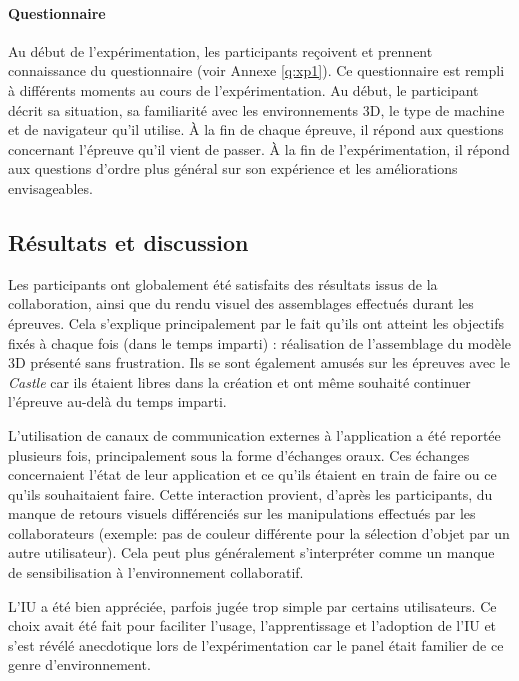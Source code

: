 \paragraph{Questionnaire}
Au début de l'expérimentation, les participants reçoivent et prennent 
con\-naissance 
du questionnaire (voir Annexe \ref{q:xp1}). Ce questionnaire est rempli à différents 
moments au cours de l'expérimentation. Au début, le participant décrit sa situation, 
sa familiarité avec les environnements \gls{3D}, le type de machine et de 
navigateur qu'il utilise. À la fin de chaque épreuve, il répond aux questions concernant 
l'épreuve qu'il vient de passer. À la fin de l'expérimentation, il répond aux 
questions d'ordre plus général sur son expérience et les améliorations 
envisageables.
\subsection{Résultats et discussion}
Les participants ont globalement été satisfaits des résultats issus de la 
collaboration, ainsi que du rendu visuel des assemblages effectués durant les 
épreuves. Cela s'explique principalement par le fait qu'ils ont atteint les 
objectifs fixés à chaque fois (dans le temps imparti) : réalisation de l'assemblage du modèle \gls{3D} 
présenté sans frustration. Ils se sont également \og amusés\fg{} sur les épreuves
avec le \textit{Castle} car ils étaient libres dans la création et ont même souhaité 
continuer l'épreuve au-delà du temps imparti. 

L'utilisation de canaux de communication 
externes à l'application a été reportée plusieurs fois, principalement sous la forme 
d'échanges oraux. Ces échanges concernaient l'état de leur application et ce qu'ils 
étaient en train de faire ou ce qu'ils souhaitaient faire. Cette interaction provient, 
d'après les participants, du manque de retours visuels différenciés sur les 
manipulations effectués par les collaborateurs (exemple: pas de couleur différente 
pour la sélection d'objet par un autre utilisateur). Cela peut plus généralement 
s'interpréter comme un manque de sensibilisation à l'environnement collaboratif. 


L'\gls{IU} a été bien appréciée, parfois jugée \og trop simple\fg{} par certains 
utilisateurs. Ce choix avait été fait pour faciliter l'usage, l'apprentissage et 
l'adoption de l'\gls{IU} et s'est révélé anecdotique lors de l'expérimentation car le 
panel était familier de ce genre d'environnement.

